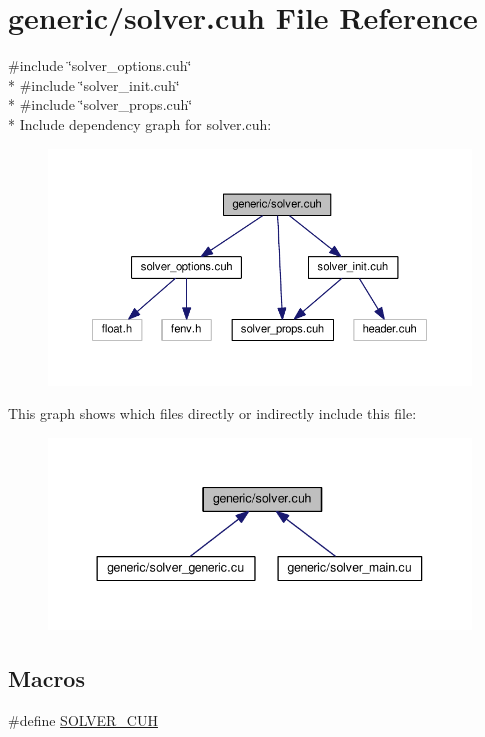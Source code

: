 \hypertarget{solver_8cuh}{}\section{generic/solver.cuh File Reference}
\label{solver_8cuh}
{\ttfamily \#include \char`\"{}solver\+\_\+options.\+cuh\char`\"{}}\\*
{\ttfamily \#include \char`\"{}solver\+\_\+init.\+cuh\char`\"{}}\\*
{\ttfamily \#include \char`\"{}solver\+\_\+props.\+cuh\char`\"{}}\\*
Include dependency graph for solver.\+cuh\+:\nopagebreak
\begin{figure}[H]
\begin{center}
\leavevmode
\includegraphics[width=350pt]{solver_8cuh__incl}
\end{center}
\end{figure}
This graph shows which files directly or indirectly include this file\+:\nopagebreak
\begin{figure}[H]
\begin{center}
\leavevmode
\includegraphics[width=344pt]{solver_8cuh__dep__incl}
\end{center}
\end{figure}
\subsection*{Macros}
\begin{DoxyCompactItemize}
\item 
\#define \hyperlink{solver_8cuh_aeb5114b5c03776476cc8e7689face990}{S\+O\+L\+V\+E\+R\+\_\+\+C\+UH}
\end{DoxyCompactItemize}
